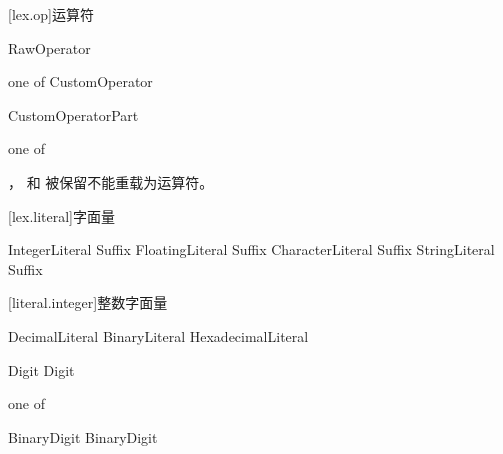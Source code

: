 [lex.op]{运算符}

\begin{bnf}
 \br
    \terminal{\lq}\bnfq RawOperator
\end{bnf}

\begin{bnf}
 \textnormal{one of} \br
    CustomOperator \terminal{, ; : ( ) [ ] \{ \}}
\end{bnf}

\begin{bnf}
 \br
    CustomOperatorPart\bnfp
\end{bnf}

\begin{bnf}
 \textnormal{one of} \br
\end{bnf}

\pnum
{}， 和 \tcode{=} 被保留不能重载为运算符。

[lex.literal]{字面量}

\begin{bnf}
 \br
    IntegerLiteral Suffix\bnfq \br
    FloatingLiteral Suffix\bnfq \br
    CharacterLiteral Suffix\bnfq \br
    StringLiteral Suffix\bnfq
\end{bnf}

[literal.integer]{整数字面量}

\begin{bnf}
 \br
    DecimalLiteral \br
    BinaryLiteral \br
    HexadecimalLiteral
\end{bnf}

\begin{bnf}
 \br
    Digit \bnflp\terminal{\textquotesingle}\bnfq Digit\bnfrp\bnfs
\end{bnf}

\begin{bnf}
 \textnormal{one of} \br
\end{bnf}

\begin{bnf}
 \br
     BinaryDigit \bnflp\terminal{\textquotesingle}\bnfq BinaryDigit\bnfrp\bnfs
\end{bnf}

\begin{bnf}
 \br
     \br
\end{bnf}

